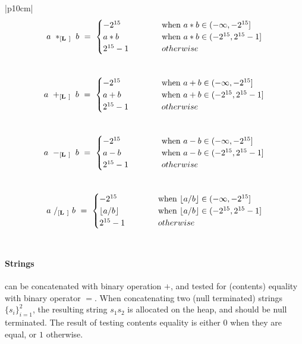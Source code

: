 \documentclass{article}
\begin{document}
\begin{table}[h]
\centering
\begin{tabular}{|p{10cm}|}
\hline
\[
a ~ *_{[\textbf{L}\ ]} ~ b ~ = ~
\begin{cases} 
-2^{15}  ~ & ~ ~ ~ ~ ~ ~ ~ ~ \text{when} ~ a*b \in (-\infty, -2^{15}] \\
a*b      ~ & ~ ~ ~ ~ ~ ~ ~ ~ \text{when} ~ a*b \in (-2^{15},2^{15}-1] \\
2^{15}-1 ~ & ~ ~ ~ ~ ~ ~ ~ ~ otherwise                                \\
\end{cases}
\]
\\ \hline
\[
a ~ +_{[\textbf{L}\ ]} ~ b ~ = ~
\begin{cases} 
-2^{15}  ~ & ~ ~ ~ ~ ~ ~ ~ ~ \text{when} ~ a+b \in (-\infty, -2^{15}] \\
a+b      ~ & ~ ~ ~ ~ ~ ~ ~ ~ \text{when} ~ a+b \in (-2^{15},2^{15}-1] \\
2^{15}-1 ~ & ~ ~ ~ ~ ~ ~ ~ ~ otherwise                                \\
\end{cases}
\]
\\ \hline
\[
a ~ -_{[\textbf{L}\ ]} ~ b ~ = ~
\begin{cases} 
-2^{15}  ~ & ~ ~ ~ ~ ~ ~ ~ ~ \text{when} ~ a-b \in (-\infty, -2^{15}] \\
a-b      ~ & ~ ~ ~ ~ ~ ~ ~ ~ \text{when} ~ a-b \in (-2^{15},2^{15}-1] \\
2^{15}-1 ~ & ~ ~ ~ ~ ~ ~ ~ ~ otherwise                                \\
\end{cases}
\]
\\ \hline
\[
a ~ /_{[\textbf{L}\ ]} ~ b ~ = ~
\begin{cases} 
-2^{15}             ~ & ~ ~ ~ ~ ~ ~ ~ ~ \text{when} ~ \lfloor a/b \rfloor \in (-\infty, -2^{15}] \\
\lfloor a/b \rfloor ~ & ~ ~ ~ ~ ~ ~ ~ ~ \text{when} ~ \lfloor a/b \rfloor \in (-2^{15},2^{15}-1] \\
2^{15}-1            ~ & ~ ~ ~ ~ ~ ~ ~ ~ otherwise                                                \\
\end{cases}
\]
\\ \hline
\end{tabular}
\caption{Semantics of \plname binary operations between integers
\label{Table_Semantics_Of_Rio_Mare_Binary_Operations_Between_Integers}}
\end{table}
\paragraph{Strings} can be concatenated with binary operation $+$,
and tested for (contents) equality with binary operator $=$.
When concatenating two (null terminated) strings $\{s_{i}\}_{i=1}^{2}$,
the resulting string $s_{1}s_{2}$ is allocated on the heap,
and should be null terminated. The result of testing contents equality
is either $0$ when they are equal, or $1$ otherwise.
\end{document}
